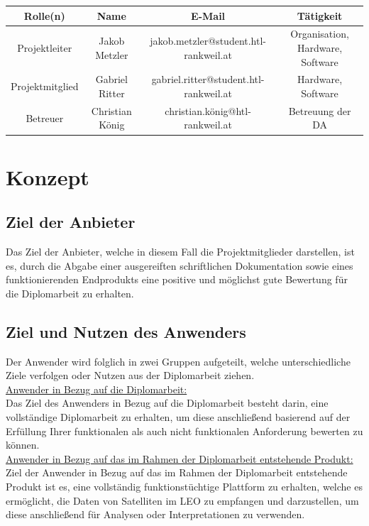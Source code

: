 \begin{tabular}{|c|c|c|c|}
	\hline
	Rolle(n) & Name & E-Mail & Tätigkeit \\
	\hline
	Projektleiter & Jakob Metzler & jakob.metzler@student.htl-rankweil.at & Organisation, Hardware, Software \\
	\hline
	Projektmitglied & Gabriel Ritter & gabriel.ritter@student.htl-rankweil.at & Hardware, Software \\
	\hline
	Betreuer & Christian König & christian.könig@htl-rankweil.at & Betreuung der DA \\
	\hline
\end{tabular}

\section{Konzept}
\subsection{Ziel der Anbieter}
Das Ziel der Anbieter, welche in diesem Fall die Projektmitglieder darstellen, ist es, durch die Abgabe 
einer ausgereiften schriftlichen Dokumentation sowie eines funktionierenden Endprodukts eine 
positive und möglichst gute Bewertung für die Diplomarbeit zu erhalten.

\subsection{Ziel und Nutzen des Anwenders}
Der Anwender wird folglich in zwei Gruppen aufgeteilt, welche unterschiedliche Ziele verfolgen oder 
Nutzen aus der Diplomarbeit ziehen.\\

\underline{Anwender in Bezug auf die Diplomarbeit:}\\
Das Ziel des Anwenders in Bezug auf die Diplomarbeit besteht darin, eine vollständige Diplomarbeit zu 
erhalten, um diese anschließend basierend auf der Erfüllung Ihrer funktionalen als auch nicht
funktionalen Anforderung bewerten zu können. \\
\underline{Anwender in Bezug auf das im Rahmen der Diplomarbeit entstehende Produkt:}\\ 
Ziel der Anwender in Bezug auf das im Rahmen der Diplomarbeit entstehende Produkt ist es, eine 
vollständig funktionstüchtige Plattform zu erhalten, welche es ermöglicht, die Daten von Satelliten im 
LEO zu empfangen und darzustellen, um diese anschließend für Analysen oder Interpretationen zu 
verwenden.

